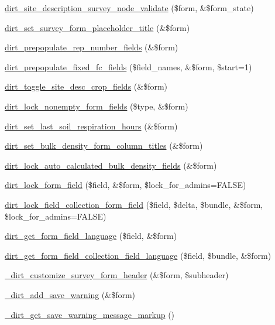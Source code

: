 \begin{DoxyCompactItemize}
\item 
\mbox{\hyperlink{dirt_8forms_8inc_a85213e4529f7189c4a02e8257cfb335b}{dirt\+\_\+site\+\_\+description\+\_\+survey\+\_\+node\+\_\+validate}} (\$form, \&\$form\+\_\+state)
\item 
\mbox{\hyperlink{dirt_8forms_8inc_a7a36ac259c693318608694c955570a7e}{dirt\+\_\+set\+\_\+survey\+\_\+form\+\_\+placeholder\+\_\+title}} (\&\$form)
\item 
\mbox{\hyperlink{dirt_8forms_8inc_ad96e6df70f3a10abb3953966f8cb008c}{dirt\+\_\+prepopulate\+\_\+rep\+\_\+number\+\_\+fields}} (\&\$form)
\item 
\mbox{\hyperlink{dirt_8forms_8inc_a7b44602b316fab8ed3e87d54ab63f156}{dirt\+\_\+prepopulate\+\_\+fixed\+\_\+fc\+\_\+fields}} (\$field\+\_\+names, \&\$form, \$start=1)
\item 
\mbox{\hyperlink{dirt_8forms_8inc_adfaa02e3241c001806a7d06e9fe84f0f}{dirt\+\_\+toggle\+\_\+site\+\_\+desc\+\_\+crop\+\_\+fields}} (\&\$form)
\item 
\mbox{\hyperlink{dirt_8forms_8inc_a5a0af5dbb5f09e3ae7591f2f79f78488}{dirt\+\_\+lock\+\_\+nonempty\+\_\+form\+\_\+fields}} (\$type, \&\$form)
\item 
\mbox{\hyperlink{dirt_8forms_8inc_a4fbc0f07cc1bad5c75f123a0cebacc2c}{dirt\+\_\+set\+\_\+last\+\_\+soil\+\_\+respiration\+\_\+hours}} (\&\$form)
\item 
\mbox{\hyperlink{dirt_8forms_8inc_ab8c5e98ddcb3a9b874a0273be4dca72d}{dirt\+\_\+set\+\_\+bulk\+\_\+density\+\_\+form\+\_\+column\+\_\+titles}} (\&\$form)
\item 
\mbox{\hyperlink{dirt_8forms_8inc_a6830f396c4f4ff235bc03468659b9f3b}{dirt\+\_\+lock\+\_\+auto\+\_\+calculated\+\_\+bulk\+\_\+density\+\_\+fields}} (\&\$form)
\item 
\mbox{\hyperlink{dirt_8forms_8inc_a4721f9a4e067adb64aab2457609b42ec}{dirt\+\_\+lock\+\_\+form\+\_\+field}} (\$field, \&\$form, \$lock\+\_\+for\+\_\+admins=F\+A\+L\+SE)
\item 
\mbox{\hyperlink{dirt_8forms_8inc_a7573daf0b5137be3fe674ab00ff0edd2}{dirt\+\_\+lock\+\_\+field\+\_\+collection\+\_\+form\+\_\+field}} (\$field, \$delta, \$bundle, \&\$form, \$lock\+\_\+for\+\_\+admins=F\+A\+L\+SE)
\item 
\mbox{\hyperlink{dirt_8forms_8inc_a33aee2d175e43a1a3d22190a8c3c7c03}{dirt\+\_\+get\+\_\+form\+\_\+field\+\_\+language}} (\$field, \&\$form)
\item 
\mbox{\hyperlink{dirt_8forms_8inc_ad71d5f75745e179cfdffa77b0a1fcd8c}{dirt\+\_\+get\+\_\+form\+\_\+field\+\_\+collection\+\_\+field\+\_\+language}} (\$field, \$bundle, \&\$form)
\item 
\mbox{\hyperlink{dirt_8forms_8inc_a1b42c0a4e690a25820c250b5019d0af7}{\+\_\+dirt\+\_\+customize\+\_\+survey\+\_\+form\+\_\+header}} (\&\$form, \$subheader)
\item 
\mbox{\hyperlink{dirt_8forms_8inc_a06268ac490f210db3ed8f52583c5f43e}{\+\_\+dirt\+\_\+add\+\_\+save\+\_\+warning}} (\&\$form)
\item 
\mbox{\hyperlink{dirt_8forms_8inc_adb38d0d8be269eadb6c3f78291f5f6c4}{\+\_\+dirt\+\_\+get\+\_\+save\+\_\+warning\+\_\+message\+\_\+markup}} ()
\end{DoxyCompactItemize}


